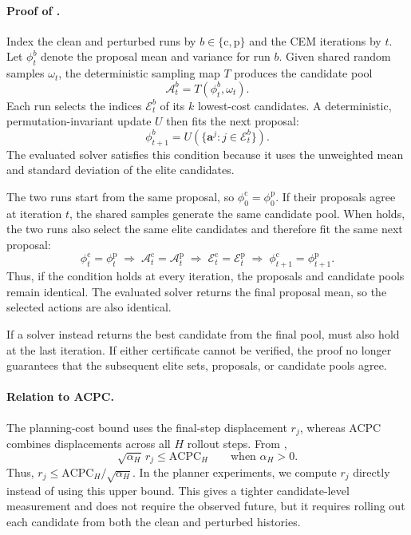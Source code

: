\documentclass[10pt]{article}
\begin{document}
\paragraph{Proof of .}
Index the clean and perturbed runs by $b\in\{\mathrm c,\mathrm p\}$ and the CEM
iterations by $t$. Let $\phi_t^b$ denote the proposal mean and variance for
run $b$. Given shared random samples $\omega_t$, the deterministic sampling
map $T$ produces the candidate pool
\[
\mathcal A_t^b=T(\phi_t^b,\omega_t).
\]
Each run selects the indices $\mathcal E_t^b$ of its $k$ lowest-cost
candidates. A deterministic, permutation-invariant update $U$ then fits the
next proposal:
\[
\phi_{t+1}^b
=U(\{\mathbf a^j:j\in\mathcal E_t^b\}).
\]
The evaluated solver satisfies this condition because it uses the unweighted
mean and standard deviation of the elite candidates.

The two runs start from the same proposal, so
$\phi_0^{\mathrm c}=\phi_0^{\mathrm p}$. If their proposals agree at iteration
$t$, the shared samples generate the same candidate pool. When
 holds, the two runs also select the same elite
candidates and therefore fit the same next proposal:
\[
\phi_t^{\mathrm c}=\phi_t^{\mathrm p}
\;\Longrightarrow\;
\mathcal A_t^{\mathrm c}=\mathcal A_t^{\mathrm p}
\;\Longrightarrow\;
\mathcal E_t^{\mathrm c}=\mathcal E_t^{\mathrm p}
\;\Longrightarrow\;
\phi_{t+1}^{\mathrm c}=\phi_{t+1}^{\mathrm p}.
\]
Thus, if the condition holds at every iteration, the proposals and candidate
pools remain identical. The evaluated solver returns the final proposal mean,
so the selected actions are also identical.

If a solver instead returns the best candidate from the final pool,
 must also hold at the last iteration. If either
certificate cannot be verified, the proof no longer guarantees that the
subsequent elite sets, proposals, or candidate pools agree.

\paragraph{Relation to ACPC.}
The planning-cost bound uses the final-step displacement $r_j$, whereas ACPC
combines displacements across all $H$ rollout steps. From ,
\[
\sqrt{\alpha_H}\,r_j
\leq \mathrm{ACPC}_H
\qquad\text{when }\alpha_H>0.
\]
Thus, $r_j\leq\mathrm{ACPC}_H/\sqrt{\alpha_H}$. In the planner experiments, we
compute $r_j$ directly instead of using this upper bound. This gives a tighter
candidate-level measurement and does not require the observed future, but it
requires rolling out each candidate from both the clean and perturbed
histories.
\end{document}

